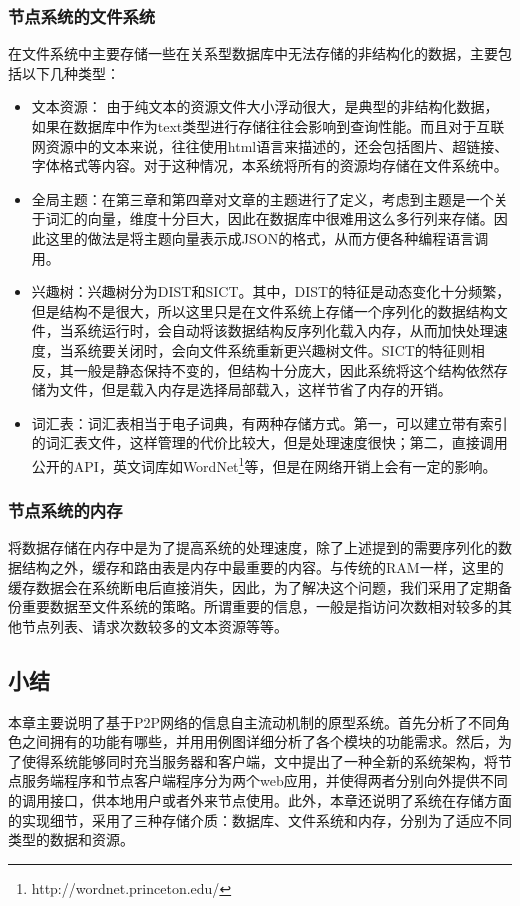 \subsubsection{节点系统的文件系统}
在文件系统中主要存储一些在关系型数据库中无法存储的非结构化的数据，主要包括以下几种类型：
\begin{itemize}
  \item 文本资源：
    由于纯文本的资源文件大小浮动很大，是典型的非结构化数据，如果在数据库中作为text类型进行存储往往会影响到查询性能。而且对于互联网资源中的文本来说，往往使用html语言来描述的，还会包括图片、超链接、字体格式等内容。对于这种情况，本系统将所有的资源均存储在文件系统中。
  \item 全局主题：在第三章和第四章对文章的主题进行了定义，考虑到主题是一个关于词汇的向量，维度十分巨大，因此在数据库中很难用这么多行列来存储。因此这里的做法是将主题向量表示成JSON的格式，从而方便各种编程语言调用。
  \item 兴趣树：兴趣树分为DIST和SICT。其中，DIST的特征是动态变化十分频繁，但是结构不是很大，所以这里只是在文件系统上存储一个序列化的数据结构文件，当系统运行时，会自动将该数据结构反序列化载入内存，从而加快处理速度，当系统要关闭时，会向文件系统重新更兴趣树文件。SICT的特征则相反，其一般是静态保持不变的，但结构十分庞大，因此系统将这个结构依然存储为文件，但是载入内存是选择局部载入，这样节省了内存的开销。
  \item 词汇表：词汇表相当于电子词典，有两种存储方式。第一，可以建立带有索引的词汇表文件，这样管理的代价比较大，但是处理速度很快；第二，直接调用公开的API，英文词库如WordNet\footnote{http://wordnet.princeton.edu/}等，但是在网络开销上会有一定的影响。
\end{itemize}

\subsubsection{节点系统的内存}
将数据存储在内存中是为了提高系统的处理速度，除了上述提到的需要序列化的数据结构之外，缓存和路由表是内存中最重要的内容。与传统的RAM一样，这里的缓存数据会在系统断电后直接消失，因此，为了解决这个问题，我们采用了定期备份重要数据至文件系统的策略。所谓重要的信息，一般是指访问次数相对较多的其他节点列表、请求次数较多的文本资源等等。


\subsection{小结}
本章主要说明了基于P2P网络的信息自主流动机制的原型系统。首先分析了不同角色之间拥有的功能有哪些，并用用例图详细分析了各个模块的功能需求。然后，为了使得系统能够同时充当服务器和客户端，文中提出了一种全新的系统架构，将节点服务端程序和节点客户端程序分为两个web应用，并使得两者分别向外提供不同的调用接口，供本地用户或者外来节点使用。此外，本章还说明了系统在存储方面的实现细节，采用了三种存储介质：数据库、文件系统和内存，分别为了适应不同类型的数据和资源。
